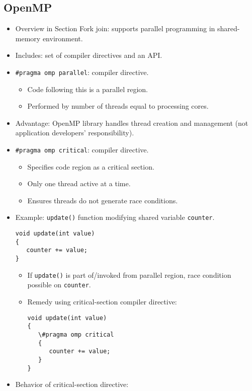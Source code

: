 \subsection{OpenMP}
\begin{itemize}
    \item Overview in Section Fork join: supports parallel programming in shared-memory environment.
    \item Includes: set of compiler directives and an API.
    \item \texttt{\#pragma omp parallel}: compiler directive.
    \begin{itemize}
        \item Code following this is a parallel region.
        \item Performed by number of threads equal to processing cores.
    \end{itemize}
    \item Advantage: OpenMP library handles thread creation and management (not application developers' responsibility).
    \item \texttt{\#pragma omp critical}: compiler directive.
    \begin{itemize}
        \item Specifies code region as a critical section.
        \item Only one thread active at a time.
        \item Ensures threads do not generate race conditions.
    \end{itemize}
    \item Example: \texttt{update()} function modifying shared variable \texttt{counter}.
    \begin{verbatim}
void update(int value)
{
   counter += value;
}
    \end{verbatim}
    \begin{itemize}
        \item If \texttt{update()} is part of/invoked from parallel region, race condition possible on \texttt{counter}.
        \item Remedy using critical-section compiler directive:
        \begin{verbatim}
void update(int value)
{
   \#pragma omp critical
   {
      counter += value;
   }
}
        \end{verbatim}
    \end{itemize}
    \item Behavior of critical-section directive:
    \begin{itemize}

\end{itemize}
\end{itemize}
